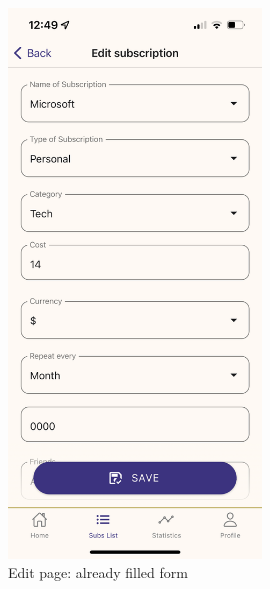 \documentclass[11pt]{article}
\begin{document}
\begin{figure}[h!]
    \centering
    \begin{minipage}[c]{0.45\textwidth}
        \centering
        \includegraphics[width=0.6\textwidth, clip]{../../assets/smartphone/edit.PNG}
        \caption{Edit page: already filled form}
        \label{fig:edit}
    \end{minipage}\hspace{1cm}%
    \begin{minipage}[c]{0.45\textwidth}
        \centering

\end{minipage}
\end{figure}
\end{document}
